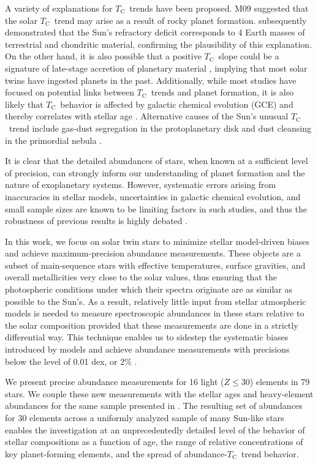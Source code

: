 \documentclass[twocolumn]{aastex62}
\newcommand{\tc}{$T_\mathrm{C}$}
\begin{document}
A variety of explanations for \tc\ trends have been proposed. M09 suggested that the solar \tc\ trend may arise as a result of rocky planet formation. \citet{chambers10} subsequently demonstrated that the Sun's refractory deficit corresponds to 4 Earth masses of terrestrial and chondritic material, confirming the plausibility of this explanation. On the other hand, it is also possible that a positive \tc\ slope could be a signature of late-stage accretion of planetary material \citep[e.g.][]{ramirez11, spina15, oh17}, implying that most solar twins have ingested planets in the past. Additionally, while most studies have focused on potential links between \tc\ trends and planet formation, it is also likely that \tc\ behavior is affected by galactic chemical evolution (GCE) and thereby correlates with stellar age \citep{adibekyan14, nissen15, spina16b}. Alternative causes of the Sun's unusual \tc\ trend include gas-dust segregation in the protoplanetary disk and dust cleansing in the primordial nebula \citep{onehag14, gaidos15}.

It is clear that the detailed abundances of stars, when known at a sufficient level of precision, can strongly inform our understanding of planet formation and the nature of exoplanetary systems. 
However, systematic errors arising from inaccuracies in stellar models, uncertainties in galactic chemical evolution, and small sample sizes are known to be limiting factors in such studies, and thus the robustness of previous results is highly debated \citep{asplund09, fortney12, hinkel16, adibekyan14, nissen15}.

In this work, we focus on solar twin stars to minimize stellar model-driven biases and achieve maximum-precision abundance measurements. These objects are a subset of main-sequence stars with effective temperatures, surface gravities, and overall metallicities very close to the solar values, thus ensuring that the photospheric conditions under which their spectra originate are as similar as possible to the Sun's. As a result, relatively little input from stellar atmospheric models is needed to measure spectroscopic abundances in these stars relative to the solar composition provided that these measurements are done in a strictly differential way. This technique enables us to sidestep the systematic biases introduced by models and achieve abundance measurements with precisions below the level of 0.01 dex, or 2\% \citep{bedell14}.

We present precise abundance measurements for 16 light ($Z \leq 30$) elements in 79 stars. We couple these new measurements with the stellar ages and heavy-element abundances for the same sample presented in \citet{spina17}. The resulting set of abundances for 30 elements across a uniformly analyzed sample of many Sun-like stars enables the investigation at an unprecedentedly detailed level of the behavior of stellar compositions as a function of age, the range of relative concentrations of key planet-forming elements, and the spread of abundance-\tc\ trend behavior.
\end{document}
